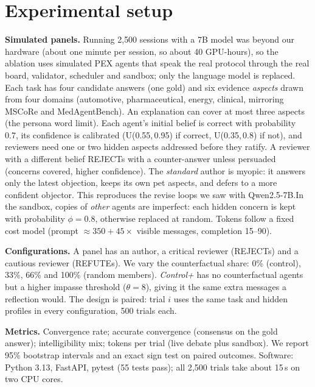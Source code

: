 \documentclass[11pt,a4paper,twocolumn]{article}
\begin{document}
\section{Experimental setup}
\textbf{Simulated panels.} Running 2{,}500 sessions with a 7B model was beyond our
hardware (about one minute per session, so about 40 GPU-hours), so the ablation uses
simulated PEX agents that speak the real protocol through the real board, validator,
scheduler and sandbox; only the language model is replaced. Each task has four candidate
answers (one gold) and six evidence \emph{aspects} drawn from four domains (automotive,
pharmaceutical, energy, clinical, mirroring MSCoRe and MedAgentBench). An explanation can
cover at most three aspects (the persona word limit). Each agent's initial belief is
correct with probability 0.7, its confidence is calibrated (U(0.55,\,0.95) if correct,
U(0.35,\,0.8) if not), and reviewers need one or two hidden aspects addressed before they
ratify. A reviewer with a different belief REJECTs with a counter-answer unless persuaded
(concerns covered, higher confidence). The \emph{standard} author is myopic: it
answers only the latest objection, keeps its own pet aspects, and defers to a more
confident objector. This reproduces the revise loops we saw with Qwen2.5-7B.In the sandbox, copies of \emph{other} agents are imperfect: each hidden concern is kept
with probability $\phi=0.8$, otherwise replaced at random. Tokens follow a fixed cost
model (prompt $\approx 350 + 45\times$ visible messages, completion 15--90).

\textbf{Configurations.} A panel has an author, a critical reviewer (REJECTs) and a
cautious reviewer (REFUTEs). We vary the counterfactual share: 0\% (control), 33\%,
66\% and 100\% (random members). \emph{Control+} has no counterfactual agents but a
higher impasse threshold ($\theta=8$), giving it the same extra messages a reflection
would. The design is paired: trial $i$ uses the same task and hidden profiles in every
configuration, 500 trials each.

\textbf{Metrics.} Convergence rate; accurate convergence (consensus on the gold answer);
intelligibility mix; tokens per trial (live debate plus sandbox). We report 95\%
bootstrap intervals and an exact sign test on paired outcomes. Software: Python 3.13,
FastAPI, pytest (55 tests pass); all 2{,}500 trials take about 15\,s on two CPU cores.
\end{document}
